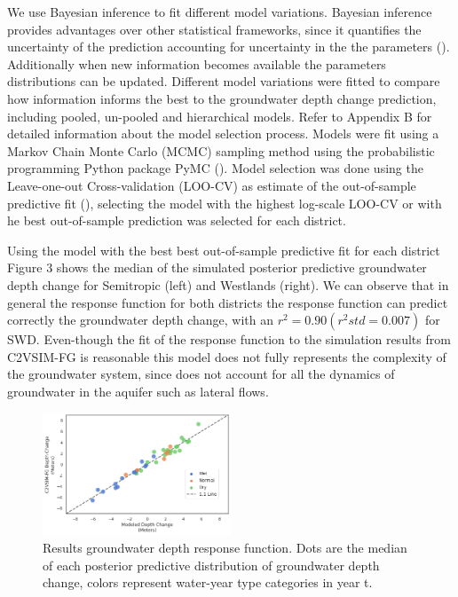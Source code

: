 \documentclass[11pt,a4paper]{article}
\begin{document}
We use Bayesian inference to fit different model variations. Bayesian inference provides advantages over other statistical frameworks, since it quantifies the uncertainty of the prediction accounting for uncertainty in the the parameters (\cite{mcelreath_statistical_2020}). Additionally when new information becomes available the parameters distributions can be updated. Different model variations were fitted to compare how information informs the best to the groundwater depth change prediction, including pooled, un-pooled and hierarchical models. Refer to Appendix B for detailed information about the model selection process. Models were fit using a Markov Chain Monte Carlo (MCMC) sampling method using the probabilistic programming Python package PyMC (\cite{salvatier_probabilistic_2016}). Model selection was done using the Leave-one-out Cross-validation (LOO-CV) as estimate of the out-of-sample predictive fit (\cite{vehtari_practical_2017}), selecting the model with the highest log-scale LOO-CV or with he best out-of-sample prediction was selected for each district.

Using the model with the best best out-of-sample predictive fit for each district Figure 3 shows the median of the simulated posterior predictive groundwater depth change for Semitropic (left) and Westlands (right). We can observe that in general the response function for both districts the response function can predict correctly the groundwater depth change, with an $r^2 = 0.90 (r^2 std = 0.007)$ for SWD. Even-though the fit of the response function to the simulation results from C2VSIM-FG is reasonable this model does not fully represents the complexity of the groundwater system, since does not account for all the dynamics of groundwater in the aquifer such as lateral flows.

\begin{figure}[H]
    \centering
    \includegraphics[width=0.5\textwidth]{results_gw_depth_response_calib.png}
    \caption{Results groundwater depth response function. Dots are the median of each posterior predictive distribution of groundwater depth change, colors represent water-year type categories in year t.}
    \label{fig:mesh1}
\end{figure}
\end{document}
